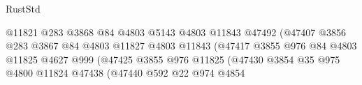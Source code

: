 \begin{lexlean}{RustStd}
\begin{coremodule}
                                                    @11821
                                                    @283
                                                    @3868
                                                    @84
                                                    @4803
                                                    @5143
                                                    @4803
                                                    @11843
                                                    @47492
                                                    (@47407
                                                      @3856
                                                      @283
                                                      @3867
                                                      @84
                                                      @4803
                                                      @11827
                                                      @4803
                                                      @11843
                                                      (@47417
                                                        @3855
                                                        @976
                                                        @84
                                                        @4803
                                                        @11825
                                                        @4627
                                                        @999
                                                        (@47425
                                                          @3855
                                                          @976
                                                          @11825
                                                          (@47430
                                                            @3854
                                                            @35
                                                            @975
                                                            @4800
                                                            @11824
                                                            @47438
                                                            (@47440
                                                              @592
                                                              @22
                                                              @974
                                                              @4854

\end{coremodule}
\end{lexlean}
